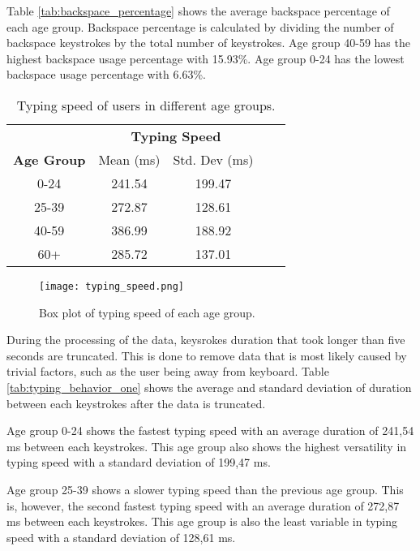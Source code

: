Table \ref{tab:backspace_percentage} shows the average backspace percentage of each age group.
Backspace percentage is calculated by dividing the number of backspace keystrokes by the total number of keystrokes.
Age group 40-59 has the highest backspace usage percentage with 15.93\%.
Age group 0-24 has the lowest backspace usage percentage with 6.63\%.


\begin{table}[h]
    \centering
    \begin{tabular}{ccccc}
    \toprule
    \multicolumn{1}{c}{} & \multicolumn{2}{c}{\textbf{Typing Speed}}\\
    \cmidrule(rl){2-3} \cmidrule(rl){4-5}
    \textbf{Age Group} & {Mean (ms)} & {Std. Dev (ms)} \\
    \midrule
    0-24 & 241.54 & 199.47 \\
    25-39 & 272.87 & 128.61  \\
    40-59 & 386.99 & 188.92 \\
    60+ & 285.72 & 137.01 \\
    \bottomrule
    \end{tabular}
    \caption{Typing speed of users in different age groups.}
    \label{tab:typing_behavior}
\end{table}

\begin{figure}[h!]
    \centering
    \texttt{[image: typing\_speed.png]}
    \caption{Box plot of typing speed of each age group.}
    \label{box_plot_typing_speed}
\end{figure}

During the processing of the data, keysrokes duration that took longer than five seconds are truncated.
This is done to remove data that is most likely caused by trivial factors, such as the user being away from keyboard.
Table \ref{tab:typing_behavior_one} shows the average and standard deviation of duration between each keystrokes after the data is truncated.

Age group 0-24 shows the fastest typing speed with an average duration of 241,54 ms between each keystrokes.
This age group also shows the highest versatility in typing speed with a standard deviation of 199,47 ms.

Age group 25-39 shows a slower typing speed than the previous age group.
This is, however, the second fastest typing speed with an average duration of 272,87 ms between each keystrokes.
This age group is also the least variable in typing speed with a standard deviation of 128,61 ms.

